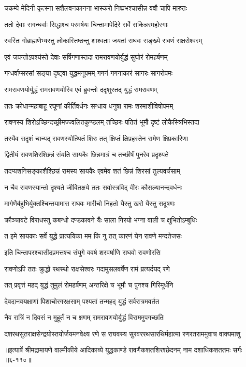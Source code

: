 \twolineshloka
{चकम्पे मेदिनी कृत्स्ना सशैलवनकानना}
{भास्करो निष्प्रभश्चासीन्न ववौ चापि मारुतः} %

\twolineshloka
{ततो देवाः सगन्धर्वाः सिद्धाश्च परमर्षयः}
{चिन्तामापेदिरे सर्वे सकिन्नरमहोरगाः} %

\twolineshloka
{स्वस्ति गोब्राह्मणेभ्यस्तु लोकास्तिष्ठन्तु शाश्वताः}
{जयतां राघवः सङ्ख्ये रावणं राक्षसेश्वरम्} %

\twolineshloka
{एवं जपन्तोऽपश्यंस्ते देवाः सर्षिगणास्तदा}
{रामरावणयोर्युद्धं सुघोरं रोमहर्षणम्} %

\twolineshloka
{गन्धर्वाप्सरसां सङ्घा दृष्ट्वा युद्धमनूपमम्}
{गगनं गगनाकारं सागरः सागरोपमः} %

\twolineshloka
{रामरावणयोर्युद्धं रामरावणयोरिव}
{एवं ब्रुवन्तो ददृशुस्तद् युद्धं रामरावणम्} %

\twolineshloka
{ततः क्रोधान्महाबाहू रघूणां कीर्तिवर्धनः}
{सन्धाय धनुषा रामः शरमाशीविषोपमम्} %

\twolineshloka
{रावणस्य शिरोऽच्छिन्दच्छ्रीमज्ज्वलितकुण्डलम्}
{तच्छिरः पतितं भूमौ दृष्टं लोकैस्त्रिभिस्तदा} %

\twolineshloka
{तस्यैव सदृशं चान्यद् रावणस्योत्थितं शिरः}
{तत् क्षिप्तं क्षिप्रहस्तेन रामेण क्षिप्रकारिणा} %

\twolineshloka
{द्वितीयं रावणशिरश्छिन्नं संयति सायकैः}
{छिन्नमात्रं च तच्छीर्षं पुनरेव प्रदृश्यते} %

\twolineshloka
{तदप्यशनिसङ्काशैश्छिन्नं रामस्य सायकैः}
{एवमेव शतं छिन्नं शिरसां तुल्यवर्चसाम्} %

\twolineshloka
{न चैव रावणस्यान्तो दृश्यते जीवितक्षये}
{ततः सर्वास्त्रविद् वीरः कौसल्यानन्दवर्धनः} %

\twolineshloka
{मार्गणैर्बहुभिर्युक्तश्चिन्तयामास राघवः}
{मारीचो निहतो यैस्तु खरो यैस्तु सदूषणः} %

\twolineshloka
{क्रौञ्चावटे विराधस्तु कबन्धो दण्डकावने}
{यैः साला गिरयो भग्ना वाली च क्षुभितोऽम्बुधिः} %

\twolineshloka
{त इमे सायकाः सर्वे युद्धे प्रात्ययिका मम}
{किं नु तत् कारणं येन रावणे मन्दतेजसः} %

\twolineshloka
{इति चिन्तापरश्चासीदप्रमत्तश्च संयुगे}
{ववर्ष शरवर्षाणि राघवो रावणोरसि} %

\twolineshloka
{रावणोऽपि ततः क्रुद्धो रथस्थो राक्षसेश्वरः}
{गदामुसलवर्षेण रामं प्रत्यर्दयद् रणे} %

\twolineshloka
{तत् प्रवृत्तं महद् युद्धं तुमुलं रोमहर्षणम्}
{अन्तरिक्षे च भूमौ च पुनश्च गिरिमूर्धनि} %

\twolineshloka
{देवदानवयक्षाणां पिशाचोरगरक्षसाम्}
{पश्यतां तन्महद् युद्धं सर्वरात्रमवर्तत} %

\twolineshloka
{नैव रात्रिं न दिवसं न मुहूर्तं न च क्षणम्}
{रामरावणयोर्युद्धं विराममुपगच्छति} %

\twolineshloka
{दशरथसुतराक्षसेन्द्रयोस्तयोर्जयमनवेक्ष्य रणे स राघवस्य}
{सुरवररथसारथिर्महात्मा रणरतराममुवाच वाक्यमाशु} %


॥इत्यार्षे श्रीमद्रामायणे वाल्मीकीये आदिकाव्ये युद्धकाण्डे रावणैकशतशिरश्छेदनम् नाम दशाधिकशततमः सर्गः ॥६-११०॥
